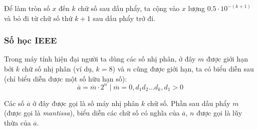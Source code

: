 \documentclass[../../Lectures.tex]{subfiles}
\begin{document}
\begin{rule_of_thumb}
    Để làm tròn số \(x\) đến \(k\) chữ số sau dấu phẩy, ta cộng vào \(x\) lượng
    \(\num{0.5} \cdot 10^{-(k+1)}\) và bỏ đi từ chữ số thứ \(k+1\) sau dấu phẩy
    trở đi.
\end{rule_of_thumb}

\subsubsection{Số học IEEE}

Trong máy tính hiện đại người ta dùng các số nhị phân, ở đây \(m\) được giới hạn
bởi \(k\) chữ số nhị phân (ví dụ, \(k = 8\)) và \(n\) cũng được giới hạn, ta có
biểu diễn sau (chỉ biểu diễn được một số hữu hạn số):
\begin{equation}
    \overline{a} = \overline{m} \cdot 2^n \mid \overline{m} = 0,d_1d_2\ldots d_k, d_1 > 0
\end{equation}

Các số \(\overline{a}\) ở đây được gọi là số máy nhị phân \(k\) chữ số. Phần sau
dấu phẩy \(m\) (được gọi là \emph{mantissa}), biểu diễn các chữ số có nghĩa của
\(\overline{a}\), \(n\) được gọi là lũy thừa của \(\overline{a}\).
\end{document}
